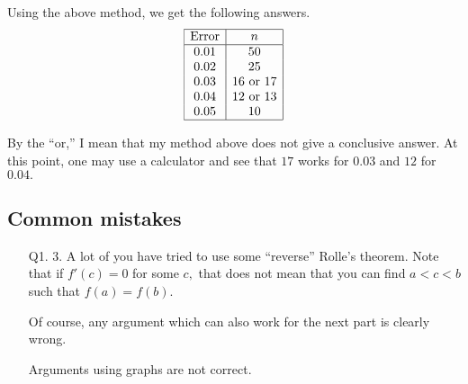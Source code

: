 \documentclass[12pt]{article}
\theoremstyle{definition}
\begin{document}
Using the above method, we get the following answers.
\begin{equation*} 
	\begin{array}{|c|c|}
		\hline
		\text{Error} & n\\
		\hline
		0.01 & 50\\
		0.02 & 25\\
		0.03 & 16 \text{ or }17\\
		0.04 & 12 \text{ or }13\\
		0.05 & 10\\
		\hline
	\end{array}
\end{equation*}

By the ``or,'' I mean that my method above does not give a conclusive answer. At this point, one may use a calculator and see that $17$ works for $0.03$ and $12$ for $0.04.$

\newpage
\subsection{Common mistakes}
\begin{itemize}
	\item[Q1. 3.] A lot of you have tried to use some ``reverse'' Rolle's theorem. Note that if $f'(c) = 0$ for some $c,$ that does not mean that you can find $a < c < b$ such that $f(a) = f(b).$

	Of course, any argument which can also work for the next part is clearly wrong.

	Arguments using graphs are not correct.
\end{itemize}
\end{document}
